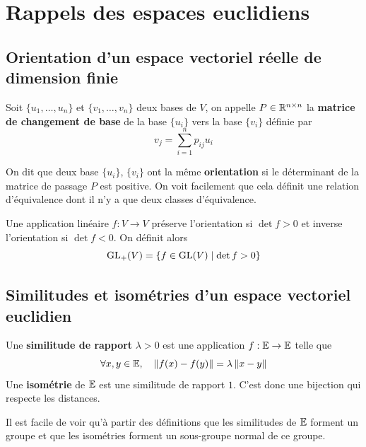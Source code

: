 \chapter{Rappels des espaces euclidiens}


\section{Orientation d'un espace vectoriel réelle de dimension finie}
Soit $\{u_1, \ldots, u_n\}$ et $\{v_1, \ldots, v_n\}$ deux bases de $V$, on appelle $P \in \mathbb{R}^{n \times n}$ la \textbf{matrice de changement de base} de la base $\{u_i\}$ vers la base $\{v_i\}$ définie par
\[
v_j = \sum_{i=1}^n p_{ij} u_i
\]

\begin{definition}[Orientation]
	On dit que deux base $\{u_i\}$, $\{v_i\}$ ont la même \textbf{orientation} si le déterminant de la matrice de passage $P$ est positive. On voit facilement que cela définit une relation d'équivalence dont il n'y a que deux classes d'équivalence. 
\end{definition}

\begin{definition}
	Une application linéaire $f : V \to V$ préserve l'orientation si $\det f > 0$ et inverse l'orientation si $\det f < 0$. On définit alors
	\[
	\operatorname{GL}_+(V) = \{ f \in \operatorname{GL}(V) \mid \det f > 0\}
	\]
\end{definition}

\section{Similitudes et isométries d'un espace vectoriel euclidien}
\begin{definition}[Similitudes] \label{def: Similitude}
Une \textbf{similitude de rapport} $\lambda > 0$ est une application $f : \mathbb E \to \mathbb E$ telle que 
\[
\forall x,y \in \mathbb E, \quad \left\| f(x) - f(y) \right\|= \lambda \left\| x -y \right\|
\]
Une \textbf{isométrie} de $\mathbb E$ est une similitude de rapport $1$. C'est donc une bijection qui respecte les distances.
\end{definition}

Il est facile de voir qu'à partir des définitions que les similitudes de $\mathbb E$ forment un groupe et que les isométries forment un sous-groupe normal de ce groupe.

